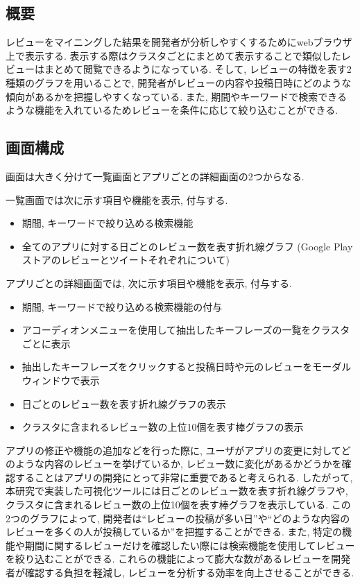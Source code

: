 \subsection{概要}
レビューをマイニングした結果を開発者が分析しやすくするためにwebブラウザ上で表示する. 表示する際はクラスタごとにまとめて表示することで類似したレビューはまとめて閲覧できるようになっている. 
そして, レビューの特徴を表す2種類のグラフを用いることで, 開発者がレビューの内容や投稿日時にどのような傾向があるかを把握しやすくなっている. また, 期間やキーワードで検索できるような機能を入れているためレビューを条件に応じて絞り込むことができる. 

\subsection{画面構成}
画面は大きく分けて一覧画面とアプリごとの詳細画面の2つからなる. 

一覧画面では次に示す項目や機能を表示, 付与する. 

\begin{itemize}
  \item 期間, キーワードで絞り込める検索機能
  \item 全てのアプリに対する日ごとのレビュー数を表す折れ線グラフ (Google Playストアのレビューとツイートそれぞれについて)
\end{itemize}

アプリごとの詳細画面では, 次に示す項目や機能を表示, 付与する.

\begin{itemize}
  \item 期間, キーワードで絞り込める検索機能の付与
  \item アコーディオンメニューを使用して抽出したキーフレーズの一覧をクラスタごとに表示
  \item 抽出したキーフレーズをクリックすると投稿日時や元のレビューをモーダルウィンドウで表示
  \item 日ごとのレビュー数を表す折れ線グラフの表示
  \item クラスタに含まれるレビュー数の上位10個を表す棒グラフの表示
\end{itemize}

アプリの修正や機能の追加などを行った際に, ユーザがアプリの変更に対してどのような内容のレビューを挙げているか, レビュー数に変化があるかどうかを確認することはアプリの開発にとって非常に重要であると考えられる. 
したがって, 本研究で実装した可視化ツールには日ごとのレビュー数を表す折れ線グラフや, クラスタに含まれるレビュー数の上位10個を表す棒グラフを表示している. 
この2つのグラフによって, 開発者は``レビューの投稿が多い日''や``どのような内容のレビューを多くの人が投稿しているか''を把握することができる. 
また, 特定の機能や期間に関するレビューだけを確認したい際には検索機能を使用してレビューを絞り込むことができる. 
これらの機能によって膨大な数があるレビューを開発者が確認する負担を軽減し, レビューを分析する効率を向上させることができる. 


